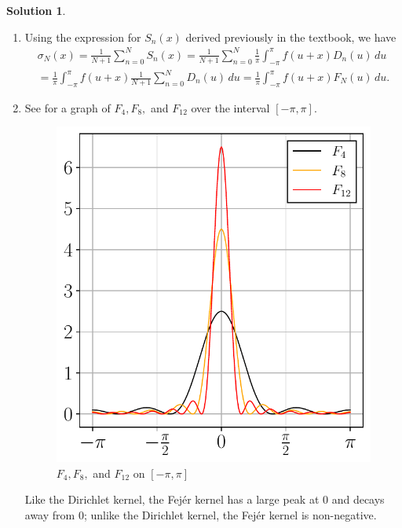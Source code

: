 \documentclass[12pt]{article}
\theoremstyle{definition}
\theoremstyle{exercise}
\theoremstyle{solution}
\newtheorem*{solution}{Solution}
\begin{document}
\begin{solution}
    \begin{enumerate}
        \item Using the expression for \( S_n(x) \) derived previously in the textbook, we have
        \begin{multline*}
            \sigma_N(x) = \frac{1}{N + 1} \sum_{n=0}^N S_n(x) = \frac{1}{N + 1} \sum_{n=0}^N \frac{1}{\pi} \int_{-\pi}^{\pi} f(u + x) D_n(u) \, du \\[3mm]
            = \frac{1}{\pi} \int_{-\pi}^{\pi} f(u + x) \frac{1}{N + 1} \sum_{n=0}^N D_n(u) \, du = \frac{1}{\pi} \int_{-\pi}^{\pi} f(u + x) F_N(u) \, du.
        \end{multline*}

        \item See  for a graph of \( F_4, F_8, \) and \( F_{12} \) over the interval \( [-\pi, \pi] \).
        \begin{figure}[H]
            \centering
            \includegraphics{UA_Section_8_5_Figure_4.pdf}
            \caption{\( F_4, F_8, \) and \( F_{12} \) on \( [-\pi, \pi] \)}
            \label{fig:4}
        \end{figure}
        Like the Dirichlet kernel, the Fejér kernel has a large peak at 0 and decays away from 0; unlike the Dirichlet kernel, the Fejér kernel is non-negative.


\end{enumerate}
\end{solution}
\end{document}
